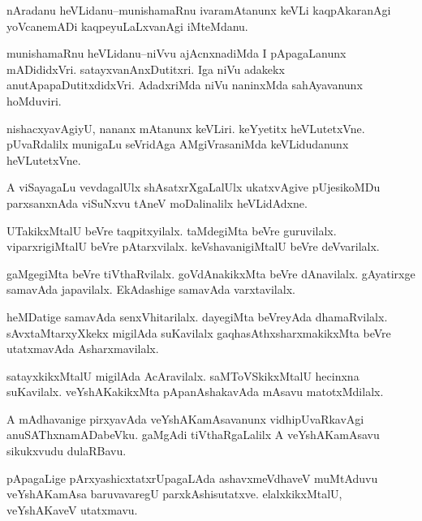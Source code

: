 \documentclass{article}
\begin{document}
\begin{mn}%
nAradanu heVLidanu--munishamaRnu ivaramAtanunx keVLi kaqpAkaranAgi yoVcanemADi 
kaqpeyuLaLxvanAgi iMteMdanu.
\end{mn}

\begin{mn}%
munishamaRnu heVLidanu--niVvu ajAcnxnadiMda I pApagaLanunx mADididxVri. 
satayxvanAnxDutitxri. Iga niVu adakekx anutApapaDutitxdidxVri. AdadxriMda niVu naninxMda 
sahAyavanunx hoMduviri.
\end{mn}

\begin{mn}%
nishacxyavAgiyU, nananx mAtanunx keVLiri. keYyetitx heVLutetxVne. pUvaRdalilx munigaLu 
seVridAga AMgiVrasaniMda keVLidudanunx heVLutetxVne.
\end{mn}

\begin{mn}%
A viSayagaLu vevdagalUlx shAsatxrXgaLalUlx ukatxvAgive pUjesikoMDu parxsanxnAda viSuNxvu 
tAneV moDalinalilx heVLidAdxne.
\end{mn}

\begin{mn}%
UTakikxMtalU beVre taqpitxyilalx. taMdegiMta beVre guruvilalx. viparxrigiMtalU beVre 
pAtarxvilalx. keVshavanigiMtalU beVre deVvarilalx.
\end{mn}

\begin{mn}%
gaMgegiMta beVre tiVthaRvilalx. goVdAnakikxMta beVre dAnavilalx. gAyatirxge samavAda 
japavilalx. EkAdashige samavAda varxtavilalx.
\end{mn}

\begin{mn}%
heMDatige samavAda senxVhitarilalx. dayegiMta beVreyAda dhamaRvilalx. sAvxtaMtarxyXkekx 
migilAda suKavilalx gaqhasAthxsharxmakikxMta beVre utatxmavAda Asharxmavilalx.
\end{mn}

\begin{mn}%
satayxkikxMtalU migilAda AcAravilalx. saMToVSkikxMtalU hecinxna suKavilalx. 
veYshAKakikxMta pApanAshakavAda mAsavu matotxMdilalx.
\end{mn}

\begin{mn}%
A mAdhavanige pirxyavAda veYshAKamAsavanunx vidhipUvaRkavAgi anuSAThxnamADabeVku. gaMgAdi 
tiVthaRgaLalilx A veYshAKamAsavu sikukxvudu dulaRBavu.
\end{mn}

\begin{mn}%
pApagaLige pArxyashicxtatxrUpagaLAda ashavxmeVdhaveV muMtAduvu veYshAKamAsa baruvavaregU 
parxkAshisutatxve. elalxkikxMtalU, veYshAKaveV utatxmavu.
\end{mn}
\end{document}
